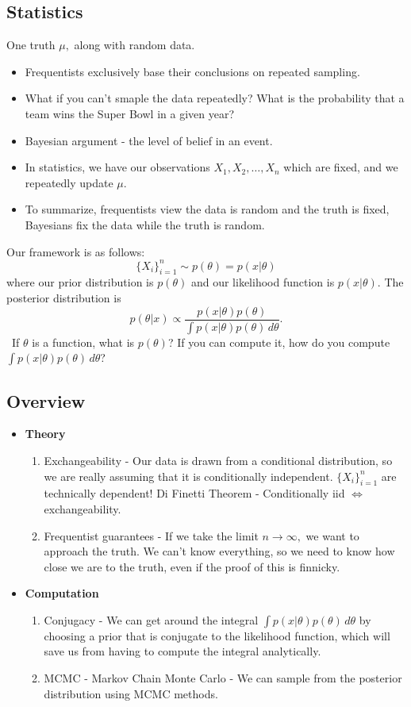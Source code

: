 \documentclass{chaistyle}
\begin{document}
\subsection*{Statistics}
One truth \(\mu,\) along with random data.
\begin{itemize}[-]
    \item Frequentists exclusively base their conclusions on repeated sampling.
    \item What if you can't smaple the data repeatedly? What is the probability that a team wins the Super Bowl in a given year?
    \item Bayesian argument - the level of belief in an event.
    \item In statistics, we have our observations \(X_1, X_2, \dots, X_n\) which are fixed, and we repeatedly update \(\mu.\)
    \item To summarize, frequentists view the data is random and the truth is fixed, Bayesians fix the data while the truth is random.
\end{itemize}
Our framework is as follows:
\[\{X_i\}_{i=1}^n\sim p(\theta)=p(x|\theta)\] where our prior distribution is \(p(\theta)\) and our likelihood function is \(p(x|\theta).\) The posterior distribution is \[p(\theta|x)\propto \frac{p(x|\theta)p(\theta)}{\int p(x|\theta)p(\theta)\,d\theta}.\]
\
If \(\theta\) is a function, what is \(p(\theta)\)? If you can compute it, how do you compute \(\int p(x|\theta)p(\theta)\,d\theta\)?
\subsection*{Overview}
\begin{itemize}[-]
    \item \textbf{Theory}
    \begin{enumerate}
        \item Exchangeability - Our data is drawn from a conditional distribution, so we are really assuming that it is conditionally independent. \(\{X_i\}_{i=1}^n\) are technically dependent! Di Finetti Theorem - Conditionally iid \(\iff\) exchangeability.
        \item Frequentist guarantees - If we take the limit \(n\to\infty,\) we want to approach the truth. We can't know everything, so we need to know how close we are to the truth, even if the proof of this is finnicky.
    \end{enumerate}
    \item \textbf{Computation}
    \begin{enumerate}
        \item Conjugacy - We can get around the integral \(\int p(x|\theta)p(\theta)\,d\theta\) by choosing a prior that is conjugate to the likelihood function, which will save us from having to compute the integral analytically.
        \item MCMC - Markov Chain Monte Carlo - We can sample from the posterior distribution using MCMC methods.
    \end{enumerate}
\end{itemize}
\end{document}
